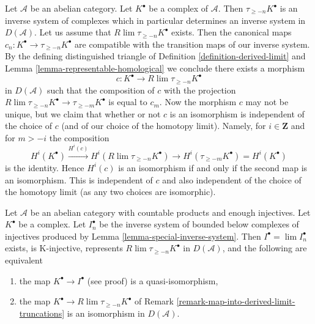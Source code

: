 \begin{remark}
\label{remark-map-into-derived-limit-truncations}
Let $\mathcal{A}$ be an abelian category. Let $K^\bullet$ be a
complex of $\mathcal{A}$. Then $\tau_{\geq -n}K^\bullet$ is an
inverse system of complexes which in particular determines
an inverse system in $D(\mathcal{A})$. Let us assume that
$R\lim \tau_{\geq -n}K^\bullet$ exists. Then the canonical maps
$c_n : K^\bullet \to \tau_{\geq -n}K^\bullet$ are compatible with the
transition maps of our inverse system. By the defining distinguished
triangle of Definition \ref{definition-derived-limit} and
Lemma \ref{lemma-representable-homological}
we conclude there exists a morphism
$$
c : K^\bullet \longrightarrow R\lim \tau_{\geq -n}K^\bullet
$$
in $D(\mathcal{A})$ such that the composition of $c$ with the projection
$R\lim \tau_{\geq -n}K^\bullet \to \tau_{\geq -m}K^\bullet$ is equal to $c_m$.
Now the morphism $c$ may not be unique, but we claim that whether or not
$c$ is an isomorphism is independent of the choice of $c$ (and of our choice
of the homotopy limit). Namely, for $i \in \mathbf{Z}$ and for $m > -i$
the composition
$$
H^i(K^\bullet) \xrightarrow{H^i(c)} H^i(R\lim \tau_{\geq -n}K^\bullet)
\to H^i(\tau_{\geq -m}K^\bullet) = H^i(K^\bullet)
$$
is the identity. Hence $H^i(c)$ is an isomorphism if and only if the
second map is an isomorphism. This is independent of $c$ and also
independent of the choice of the homotopy limit (as any two choices
are isomorphic).
\end{remark}

\begin{lemma}
\label{lemma-difficulty-K-injectives}
Let $\mathcal{A}$ be an abelian category with countable products and
enough injectives. Let $K^\bullet$ be a complex. Let $I_n^\bullet$ be
the inverse system of bounded below complexes of injectives produced by
Lemma \ref{lemma-special-inverse-system}. Then
$I^\bullet = \lim I_n^\bullet$ exists, is K-injective, represents
$R\lim \tau_{\geq -n}K^\bullet$ in $D(\mathcal{A})$,
and the following are equivalent
\begin{enumerate}
\item the map $K^\bullet \to I^\bullet$ (see proof) is a quasi-isomorphism,
\item the map $K^\bullet \to R\lim \tau_{\geq -n}K^\bullet$
of Remark \ref{remark-map-into-derived-limit-truncations}
is an isomorphism in $D(\mathcal{A})$.
\end{enumerate}
\end{lemma}

